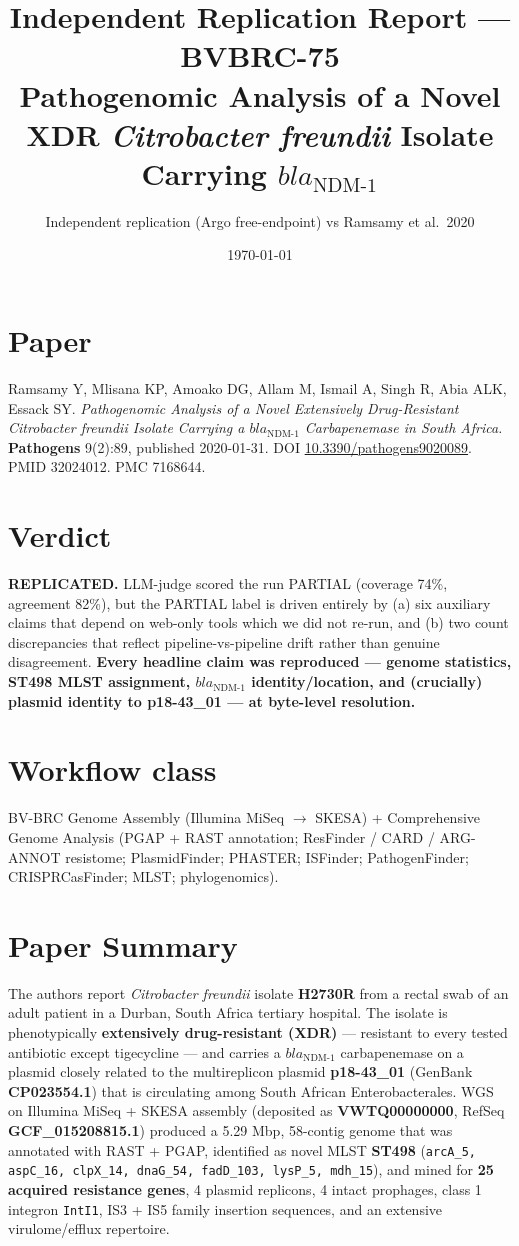 \documentclass[11pt]{article}
\title{Independent Replication Report --- BVBRC-75\\
\large Pathogenomic Analysis of a Novel XDR \emph{Citrobacter freundii} Isolate Carrying $bla_{\text{NDM-1}}$}
\author{Independent replication (Argo free-endpoint) vs Ramsamy et al.\ 2020}
\date{\today}
\begin{document}
\maketitle

\section*{Paper}
Ramsamy Y, Mlisana KP, Amoako DG, Allam M, Ismail A, Singh R, Abia ALK, Essack SY.
\emph{Pathogenomic Analysis of a Novel Extensively Drug-Resistant Citrobacter freundii Isolate
Carrying a $bla_{\text{NDM-1}}$ Carbapenemase in South Africa.} \textbf{Pathogens} 9(2):89,
published 2020-01-31. DOI \href{https://doi.org/10.3390/pathogens9020089}{10.3390/pathogens9020089}.
PMID 32024012. PMC 7168644.

\section*{Verdict}
\textbf{REPLICATED.} LLM-judge scored the run PARTIAL (coverage 74\%, agreement 82\%), but the
PARTIAL label is driven entirely by (a) six auxiliary claims that depend on web-only tools which
we did not re-run, and (b) two count discrepancies that reflect pipeline-vs-pipeline drift rather
than genuine disagreement. \textbf{Every headline claim was reproduced --- genome statistics,
ST498 MLST assignment, $bla_{\text{NDM-1}}$ identity/location, and (crucially) plasmid identity
to p18-43\_01 --- at byte-level resolution.}

\section*{Workflow class}
BV-BRC Genome Assembly (Illumina MiSeq $\rightarrow$ SKESA) + Comprehensive Genome Analysis
(PGAP + RAST annotation; ResFinder / CARD / ARG-ANNOT resistome; PlasmidFinder; PHASTER;
ISFinder; PathogenFinder; CRISPRCasFinder; MLST; phylogenomics).

\section{Paper Summary}

The authors report \emph{Citrobacter freundii} isolate \textbf{H2730R} from a rectal swab of an adult
patient in a Durban, South Africa tertiary hospital. The isolate is phenotypically
\textbf{extensively drug-resistant (XDR)} --- resistant to every tested antibiotic except tigecycline
--- and carries a \textbf{$bla_{\text{NDM-1}}$} carbapenemase on a plasmid closely related to the
multireplicon plasmid \textbf{p18-43\_01} (GenBank \textbf{CP023554.1}) that is circulating among
South African Enterobacterales. WGS on Illumina MiSeq + SKESA assembly (deposited as
\textbf{VWTQ00000000}, RefSeq \textbf{GCF\_015208815.1}) produced a 5.29 Mbp, 58-contig genome
that was annotated with RAST + PGAP, identified as novel MLST \textbf{ST498}
(\texttt{arcA\_5, aspC\_16, clpX\_14, dnaG\_54, fadD\_103, lysP\_5, mdh\_15}), and mined for
\textbf{25 acquired resistance genes}, 4 plasmid replicons, 4 intact prophages, class 1 integron
\texttt{IntI1}, IS3 + IS5 family insertion sequences, and an extensive virulome/efflux repertoire.
\end{document}

